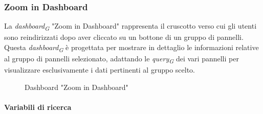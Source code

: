 \subsubsection{Zoom in Dashboard}
La \textit{dashboard}\textsubscript{\textit{G}} "Zoom in Dashboard" rappresenta il cruscotto verso cui gli utenti sono reindirizzati dopo aver cliccato su un bottone di un gruppo di pannelli. Questa \textit{dashboard}\textsubscript{\textit{G}} è progettata per mostrare in dettaglio le informazioni relative al gruppo di pannelli selezionato, adattando le \textit{query}\textsubscript{\textit{G}} dei vari pannelli per visualizzare esclusivamente i dati pertinenti al gruppo scelto. 
\begin{figure}[H]
    \centering
    \caption{Dashboard "Zoom in Dashboard"}
    \label{fig:my_label}
\end{figure}

\paragraph{Variabili di ricerca}

